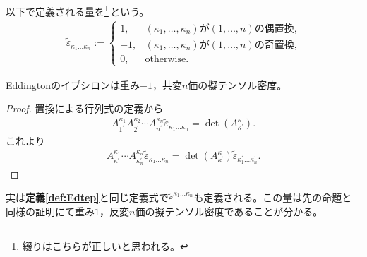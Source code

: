 \documentclass[uplatex]{jsarticle}
\begin{document}
\begin{teigi}[Eddingtonのイプシロン]
  \label{def:Edtep}
  以下で定義される量を\footnote{綴りはこちらが正しいと思われる。}\,という。
  \begin{align}
    \tilde{\varepsilon}_{\kappa_{1} \dots \kappa_{n}} := \begin{cases}
      1, & (\kappa_{1}, \dots, \kappa_{n})\text{が}(1,\dots,n)\text{の偶置換,} \\
      -1, & (\kappa_{1}, \dots, \kappa_{n})\text{が}(1,\dots,n)\text{の奇置換,} \\
      0, & \text{otherwise.}
    \end{cases}
  \end{align}
\end{teigi}

\begin{prop}
  Eddingtonのイプシロンは重み$-1$，共変$n$価の擬テンソル密度。
\end{prop}
\begin{proof}
  置換による行列式の定義から
  \begin{align*}
    A_{1^{\prime}}^{\kappa_{1}} A_{2^{\prime}}^{\kappa_{2}} \cdots A_{n^{\prime}}^{\kappa_{n}} \tilde{\varepsilon}_{\kappa_{1} \ldots \kappa_{n}} = \det \left(A_{\kappa^{\prime}}^{\kappa} \right).
  \end{align*}
  これより
  \begin{align*}
    A_{\kappa^{\prime}_{1}}^{\kappa_{1}} \cdots A_{\kappa^{\prime}_{n}}^{\kappa_{n}} \tilde{\varepsilon}_{\kappa_{1} \ldots \kappa_{n}} = \det \left(A_{\kappa^{\prime}}^{\kappa} \right) \tilde{\varepsilon}_{\kappa^{\prime}_{1} \dots \kappa^{\prime}_{n}}.
  \end{align*}
\end{proof}

実は\textbf{定義\ref{def:Edtep}}と同じ定義式で$\tilde{\varepsilon}^{\kappa_{1}\dots\kappa_{n}}$も定義される。この量は先の命題と同様の証明にて重み$1$，反変$n$価の擬テンソル密度であることが分かる。
\end{document}
